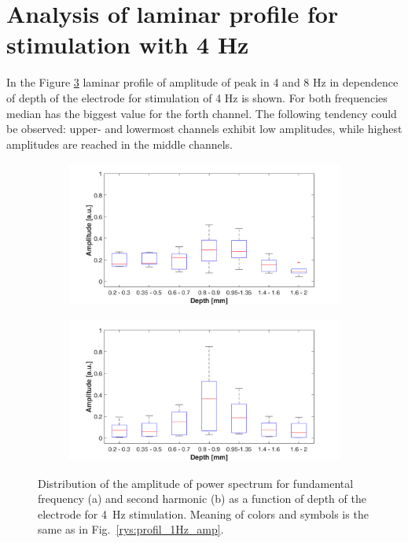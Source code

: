 \documentclass{pracalicmgr}
\begin{document}
  
\section{Analysis of laminar profile for stimulation with 4 Hz} 

 In the Figure \ref{rys:profil_4Hz_wid} laminar profile of amplitude of peak in 4 and 8 Hz in dependence of depth of the electrode for stimulation of 4 Hz is shown. For both frequencies median has the biggest value for the forth channel. The following tendency could be observed: upper- and lowermost channels exhibit low amplitudes, while highest amplitudes are reached in the middle channels. 

   	\begin{figure}[H]
	\begin{subfigure}{.5\textwidth}
		\centering
		\includegraphics[width=1.\linewidth]{profile_4Hz_wid.png}
		\caption{}
		\label{rys:profil_4Hz_wid1}
	\end{subfigure}%
	\begin{subfigure}{.5\textwidth}
		\centering
		\includegraphics[width=1.\linewidth]{profile_4Hz_wid2.png}
		\caption{}
		\label{rys:profil_4Hz_wid2}
	\end{subfigure}
	\caption{Distribution of the amplitude of power spectrum for fundamental frequency (a) and second harmonic (b) as a function of depth of the electrode for 4~Hz stimulation. Meaning of colors and symbols is the same as in Fig.~\ref{rys:profil_1Hz_amp}.}
	\label{rys:profil_4Hz_wid}
\end{figure}
\end{document}
